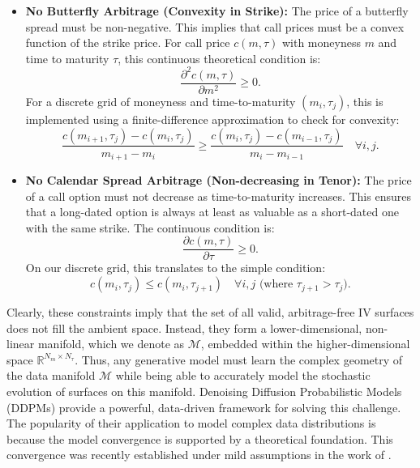 \documentclass{article}
\begin{document}
\begin{itemize}
    \item \textbf{No Butterfly Arbitrage (Convexity in Strike):} The price of a butterfly spread must be non-negative. This implies that call prices must be a convex function of the strike price. For call price $c(m, \tau)$ with moneyness $m$ and time to maturity $\tau$, this continuous theoretical condition is:
    $$
    \frac{\partial^2 c(m, \tau)}{\partial m^2} \ge 0.
    $$
    For a discrete grid of moneyness and time-to-maturity $(m_i, \tau_j)$, this is implemented using a finite-difference approximation to check for convexity:
    \begin{equation} \label{eq:no_butterfly}
        \frac{c(m_{i+1}, \tau_j) - c(m_i, \tau_j)}{m_{i+1} - m_i} \ge \frac{c(m_i, \tau_j) - c(m_{i-1}, \tau_j)}{m_i - m_{i-1}} \quad \forall i, j.
    \end{equation}

    \item \textbf{No Calendar Spread Arbitrage (Non-decreasing in Tenor):} The price of a call option must not decrease as time-to-maturity increases. This ensures that a long-dated option is always at least as valuable as a short-dated one with the same strike. The continuous condition is:
    $$
    \frac{\partial c(m, \tau)}{\partial \tau} \ge 0.
    $$
    On our discrete grid, this translates to the simple condition:
    \begin{equation} \label{eq:no_calendar}
        c(m_i, \tau_j) \le c(m_i, \tau_{j+1}) \quad \forall i, j \text{ (where } \tau_{j+1} > \tau_j\text{)}.
    \end{equation}
\end{itemize}
Clearly, these constraints imply that the set of all valid, arbitrage-free IV surfaces does not fill the ambient space. Instead, they form a lower-dimensional, non-linear manifold, which we denote as $\mathcal{M}$, embedded within the higher-dimensional space $\mathbb{R}^{N_m \times N_\tau}$. Thus, any generative model must learn the complex geometry of the data manifold $\mathcal{M}$ while being able to accurately model the stochastic evolution of surfaces on this manifold. Denoising Diffusion Probabilistic Models (DDPMs) provide a powerful, data-driven framework for solving this challenge. The popularity of their application to model complex data distributions is because the model convergence is supported by a theoretical foundation. This convergence was recently established under mild assumptions in the work of \citep{Nakano_2025}.
\end{document}
